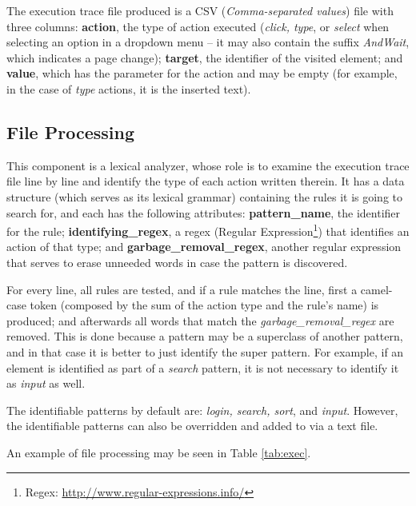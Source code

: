 \documentclass[conference]{IEEEtran}
\begin{document}
The execution trace file produced is a CSV (\textit{Comma-separated values}) file with three columns: \textbf{action}, the type of action executed (\textit{click, type}, or \textit{select} when selecting an option in a dropdown menu -- it may also contain the suffix \textit{AndWait}, which indicates a page change); \textbf{target}, the identifier of the visited element; and \textbf{value}, which has the parameter for the action and may be empty (for example, in the case of \textit{type} actions, it is the inserted text).

\subsection{File Processing}\label{sec:fp}
This component is a lexical analyzer, whose role is to examine the execution trace file line by line and identify the type of each action written therein. It has a data structure (which serves as its lexical grammar) containing the rules it is going to search for, and each has the following attributes: \textbf{pattern\_name}, the identifier for the rule; \textbf{identifying\_regex}, a regex (Regular Expression\footnote{Regex: \url{http://www.regular-expressions.info/}}) that identifies an action of that type; and \textbf{garbage\_removal\_regex}, another regular expression that serves to erase unneeded words in case the pattern is discovered. 

For every line, all rules are tested, and if a rule matches the line, first a camel-case token (composed by the sum of the action type and the rule's name) is produced; and afterwards all words that match the \textit{garbage\_removal\_regex} are removed. This is done because a pattern may be a superclass of another pattern, and in that case it is better to just identify the super pattern. For example, if an element is identified as part of a \textit{search} pattern, it is not necessary to identify it as \textit{input} as well.

The identifiable patterns by default are: \textit{login, search, sort}, and \textit{input}. However, the identifiable patterns can also be overridden and added to via a text file.

An example of file processing may be seen in Table \ref{tab:exec}.
\end{document}
